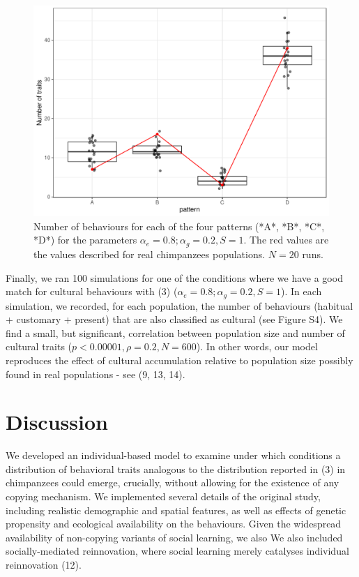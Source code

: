 \documentclass[9pt,twocolumn,twoside,]{pnas-new}
\begin{document}
\begin{figure}[h!]
\begin{center}
\includegraphics[width=11.4cm]{figures/figure_4.pdf}
\caption{Number of behaviours for each of the four patterns (*A*, *B*, *C*, *D*) for the parameters $\alpha_e=0.8;\alpha_g=0.2,S=1$. The red values are the values described for real chimpanzees populations. $N=20$ runs.}
\label{Figure4}
\end{center}
\end{figure}

Finally, we ran 100 simulations for one of the conditions where we have
a good match for cultural behaviours with (3)
(\(\alpha_e=0.8;\alpha_g=0.2, S=1\)). In each simulation, we recorded,
for each population, the number of behaviours (habitual + customary +
present) that are also classified as cultural (see Figure S4). We find a
small, but significant, correlation between population size and number
of cultural traits (\(p<0.00001,\rho=0.2,N=600\)). In other words, our
model reproduces the effect of cultural accumulation relative to
population size possibly found in real populations - see (9, 13, 14).

\section*{Discussion}\label{discussion}

We developed an individual-based model to examine under which conditions
a distribution of behavioral traits analogous to the distribution
reported in (3) in chimpanzees could emerge, crucially, without allowing
for the existence of any copying mechanism. We implemented several
details of the original study, including realistic demographic and
spatial features, as well as effects of genetic propensity and
ecological availability on the behaviours. Given the widespread
availability of non-copying variants of social learning, we also We also
included socially-mediated reinnovation, where social learning merely
catalyses individual reinnovation (12).
\end{document}
